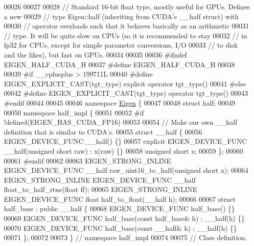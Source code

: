 \begin{DoxyCode}
00026 
00027 
00028 \textcolor{comment}{// Standard 16-bit float type, mostly useful for GPUs. Defines a new}
00029 \textcolor{comment}{// type Eigen::half (inheriting from CUDA's \_\_half struct) with}
00030 \textcolor{comment}{// operator overloads such that it behaves basically as an arithmetic}
00031 \textcolor{comment}{// type. It will be quite slow on CPUs (so it is recommended to stay}
00032 \textcolor{comment}{// in fp32 for CPUs, except for simple parameter conversions, I/O}
00033 \textcolor{comment}{// to disk and the likes), but fast on GPUs.}
00034 
00035 
00036 \textcolor{preprocessor}{#ifndef EIGEN\_HALF\_CUDA\_H}
00037 \textcolor{preprocessor}{#define EIGEN\_HALF\_CUDA\_H}
00038 
00039 \textcolor{preprocessor}{#if \_\_cplusplus > 199711L}
00040 \textcolor{preprocessor}{#define EIGEN\_EXPLICIT\_CAST(tgt\_type) explicit operator tgt\_type()}
00041 \textcolor{preprocessor}{#else}
00042 \textcolor{preprocessor}{#define EIGEN\_EXPLICIT\_CAST(tgt\_type) operator tgt\_type()}
00043 \textcolor{preprocessor}{#endif}
00044 
00045 
00046 \textcolor{keyword}{namespace }\hyperlink{namespace_eigen}{Eigen} \{
00047 
00048 \textcolor{keyword}{struct }half;
00049 
00050 \textcolor{keyword}{namespace }half\_impl \{
00051 
00052 \textcolor{preprocessor}{#if !defined(EIGEN\_HAS\_CUDA\_FP16)}
00053 
00054 \textcolor{comment}{// Make our own \_\_half definition that is similar to CUDA's.}
00055 \textcolor{keyword}{struct }\_\_half \{
00056   EIGEN\_DEVICE\_FUNC \_\_half() \{\}
00057   \textcolor{keyword}{explicit} EIGEN\_DEVICE\_FUNC \_\_half(\textcolor{keywordtype}{unsigned} \textcolor{keywordtype}{short} raw) : x(raw) \{\}
00058   \textcolor{keywordtype}{unsigned} \textcolor{keywordtype}{short} x;
00059 \};
00060 
00061 \textcolor{preprocessor}{#endif}
00062 
00063 EIGEN\_STRONG\_INLINE EIGEN\_DEVICE\_FUNC \_\_half raw\_uint16\_to\_half(\textcolor{keywordtype}{unsigned} \textcolor{keywordtype}{short} x);
00064 EIGEN\_STRONG\_INLINE EIGEN\_DEVICE\_FUNC \_\_half float\_to\_half\_rtne(\textcolor{keywordtype}{float} ff);
00065 EIGEN\_STRONG\_INLINE EIGEN\_DEVICE\_FUNC \textcolor{keywordtype}{float} half\_to\_float(\_\_half h);
00066 
00067 \textcolor{keyword}{struct }half\_base : \textcolor{keyword}{public} \_\_half \{
00068   EIGEN\_DEVICE\_FUNC half\_base() \{\}
00069   EIGEN\_DEVICE\_FUNC half\_base(\textcolor{keyword}{const} half\_base& h) : \_\_half(h) \{\}
00070   EIGEN\_DEVICE\_FUNC half\_base(\textcolor{keyword}{const} \_\_half& h) : \_\_half(h) \{\}
00071 \};
00072 
00073 \} \textcolor{comment}{// namespace half\_impl}
00074 
00075 \textcolor{comment}{// Class definition.}

\end{DoxyCode}
